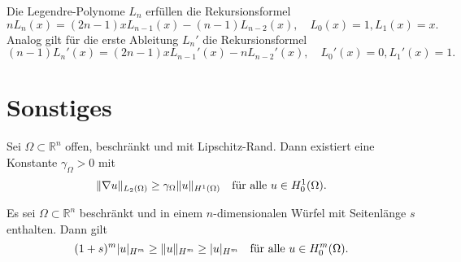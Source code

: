 \begin{Bemerkung}
\label{satz:legendre_polynome_rekursion}
    Die Legendre-Polynome $L_{n}$ erfüllen die Rekursionsformel
    \begin{equation}
        n L_{n}(x) = (2n - 1) x L_{n-1}(x) - (n - 1) L_{n-2}(x), \quad L_{0}(x) = 1, L_{1}(x) = x.
    \end{equation}
    Analog gilt für die erste Ableitung $L_{n}'$ die Rekursionsformel
    \begin{equation}
        (n - 1) L_{n}'(x) = (2n -1) x L_{n-1}'(x) - n L_{n-2}'(x), \quad L_{0}'(x) = 0, L_{1}'(x) = 1.
    \end{equation}
\end{Bemerkung}

\section{Sonstiges} %
\label{sec:sonstiges}


\begin{Satz}
\label{satz:gl:poincare_friedrichs_ungleichung}
    Sei $\Omega \subset \mathbb{R}^{n}$ offen, beschränkt und mit Lipschitz-Rand.
    Dann existiert eine Konstante $\gamma_{\Omega} > 0$ mit
    \begin{equation}
        \label{eq:gl:poincare_friedrichs_ungleichung}
        \norm{\grad u}_{L_{2}(\Omega)} \geq \gamma_{\Omega} \norm{u}_{H^{1}(\Omega)} \quad \fa u \in H^{1}_{0}(\Omega).
    \end{equation}
\end{Satz}

\begin{Satz}
    Es sei $\Omega \subset \mathbb{R}^{n}$ beschränkt und in einem $n$-dimensionalen Würfel mit Seitenlänge $s$ enthalten.
    Dann gilt
    \begin{equation}
        (1 + s)^{m} \lvert u\rvert_{H^{m}} \geq \lVert u\rVert_{H^{m}} \geq \lvert u\rvert_{H^{m}} \quad \text{für alle}~u \in H^{m}_{0}(\Omega).
    \end{equation}
\end{Satz}


